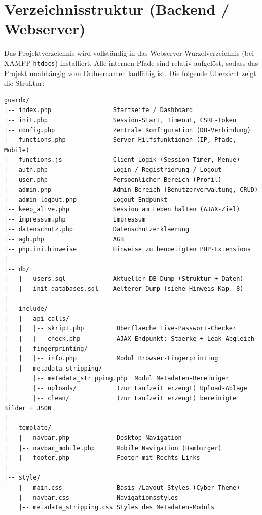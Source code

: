 \chapter{Verzeichnisstruktur (Backend / Webserver)}
\label{ch:a-verzeichnis}

Das Projektverzeichnis wird vollst\"andig in das Webserver-Wurzelverzeichnis (bei XAMPP
\texttt{htdocs}) installiert. Alle internen Pfade sind relativ aufgel\"ost, sodass das Projekt
unabh\"angig vom Ordnernamen lauff\"ahig ist. Die folgende \"Ubersicht zeigt die Struktur:

\begin{lstlisting}[numbers=none]
guardx/
|-- index.php                 Startseite / Dashboard
|-- init.php                  Session-Start, Timeout, CSRF-Token
|-- config.php                Zentrale Konfiguration (DB-Verbindung)
|-- functions.php             Server-Hilfsfunktionen (IP, Pfade, Mobile)
|-- functions.js              Client-Logik (Session-Timer, Menue)
|-- auth.php                  Login / Registrierung / Logout
|-- user.php                  Persoenlicher Bereich (Profil)
|-- admin.php                 Admin-Bereich (Benutzerverwaltung, CRUD)
|-- admin_logout.php          Logout-Endpunkt
|-- keep_alive.php            Session am Leben halten (AJAX-Ziel)
|-- impressum.php             Impressum
|-- datenschutz.php           Datenschutzerklaerung
|-- agb.php                   AGB
|-- php.ini.hinweise          Hinweise zu benoetigten PHP-Extensions
|
|-- db/
|   |-- users.sql             Aktueller DB-Dump (Struktur + Daten)
|   |-- init_databases.sql    Aelterer Dump (siehe Hinweis Kap. 8)
|
|-- include/
|   |-- api-calls/
|   |   |-- skript.php         Oberflaeche Live-Passwort-Checker
|   |   |-- check.php          AJAX-Endpunkt: Staerke + Leak-Abgleich
|   |-- fingerprinting/
|   |   |-- info.php           Modul Browser-Fingerprinting
|   |-- metadata_stripping/
|       |-- metadata_stripping.php  Modul Metadaten-Bereiniger
|       |-- uploads/           (zur Laufzeit erzeugt) Upload-Ablage
|       |-- clean/             (zur Laufzeit erzeugt) bereinigte Bilder + JSON
|
|-- template/
|   |-- navbar.php             Desktop-Navigation
|   |-- navbar_mobile.php      Mobile Navigation (Hamburger)
|   |-- footer.php             Footer mit Rechts-Links
|
|-- style/
    |-- main.css               Basis-/Layout-Styles (Cyber-Theme)
    |-- navbar.css             Navigationsstyles
    |-- metadata_stripping.css Styles des Metadaten-Moduls
\end{lstlisting}

